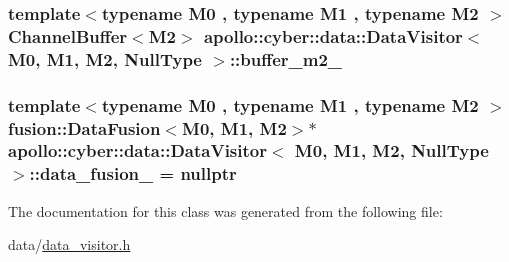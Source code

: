 \hypertarget{classapollo_1_1cyber_1_1data_1_1DataVisitor_3_01M0_00_01M1_00_01M2_00_01NullType_01_4_a80b92e97959fdc21afe4ddc138374b99}{
\subsubsection[{buffer\-\_\-m2\-\_\-}]{\setlength{\rightskip}{0pt plus 5cm}template$<$typename M0 , typename M1 , typename M2 $>$ {\bf Channel\-Buffer}$<$M2$>$ {\bf apollo\-::cyber\-::data\-::\-Data\-Visitor}$<$ M0, M1, M2, {\bf Null\-Type} $>$\-::buffer\-\_\-m2\-\_\-\hspace{0.3cm}{\ttfamily [private]}}}\label{classapollo_1_1cyber_1_1data_1_1DataVisitor_3_01M0_00_01M1_00_01M2_00_01NullType_01_4_a80b92e97959fdc21afe4ddc138374b99}
\hypertarget{classapollo_1_1cyber_1_1data_1_1DataVisitor_3_01M0_00_01M1_00_01M2_00_01NullType_01_4_a84a90a04bbe766d4e0cbf063be5bdc59}{
\subsubsection[{data\-\_\-fusion\-\_\-}]{\setlength{\rightskip}{0pt plus 5cm}template$<$typename M0 , typename M1 , typename M2 $>$ {\bf fusion\-::\-Data\-Fusion}$<$M0, M1, M2$>$$\ast$ {\bf apollo\-::cyber\-::data\-::\-Data\-Visitor}$<$ M0, M1, M2, {\bf Null\-Type} $>$\-::data\-\_\-fusion\-\_\- = nullptr\hspace{0.3cm}{\ttfamily [private]}}}\label{classapollo_1_1cyber_1_1data_1_1DataVisitor_3_01M0_00_01M1_00_01M2_00_01NullType_01_4_a84a90a04bbe766d4e0cbf063be5bdc59}


The documentation for this class was generated from the following file\-:\begin{DoxyCompactItemize}
\item 
data/\hyperlink{data__visitor_8h}{data\-\_\-visitor.\-h}\end{DoxyCompactItemize}
